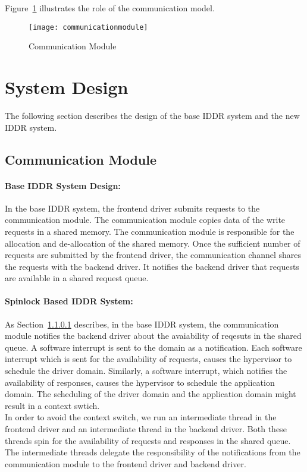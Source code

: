 Figure~\ref{fig:communication} illustrates the role of the communication model. 
\begin{figure}[!ht]
\centering
\texttt{[image: communicationmodule]}
\caption{Communication Module}
\label{fig:communication}
\end{figure}

\section{System Design}\label{design}

The following section describes the design of the base IDDR system and the new IDDR system. 

\subsection{Communication Module}

\paragraph{Base IDDR System Design:}
\label{par:base IDDR communication}
In the base IDDR system, the frontend driver submits requests to the communication module. The communication module copies data of the write requests in a shared memory. The communication module is responsible for the allocation and de-allocation of the shared memory. Once the sufficient number of requests are submitted by the frontend driver, the communication channel shares the requests with the backend driver. It notifies the backend driver that requests are available in a shared request queue.

\paragraph{Spinlock Based IDDR System:}
\label{par:spin IDDR communication}
As Section~\ref{par:base IDDR communication} describes, in the base IDDR system, the communication module notifies the backend driver about the avaiability of reqesuts in the shared queue. A software interrupt is sent to the domain as a notification. Each software interrupt which is sent for the availability of requests, causes the hypervisor to schedule the driver domain. Similarly, a software interrupt, which notifies the availability of responses, causes the hypervisor to schedule the application domain. The scheduling of the driver domain and the application domain might result in a context swtich. 
\\[3mm]
In order to avoid the context switch, we run an intermediate thread in the frontend driver and an intermediate thread in the backend driver. Both these threads spin for the availability of requests and responses in the shared queue. The intermediate threads delegate the responsibility of the notifications from the communication module to the frontend driver and backend driver. 

